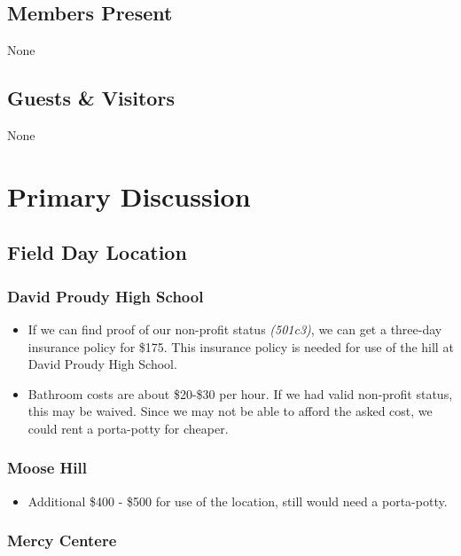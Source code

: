 \documentclass[10pt,letterpaper]{article}
\begin{document}
\subsection{Members Present}

None

\subsection{Guests \& Visitors}

None

\section{Primary Discussion}

\subsection{Field Day Location}

\subsubsection{David Proudy High School}

\begin{itemize}
\item If we can find proof of our non-profit status \emph{(501c3)}, we can get a three-day insurance policy for \$175. This insurance policy is needed for use of the hill at David Proudy High School.
\item Bathroom costs are about \$20-\$30 per hour. If we had valid non-profit status, this may be waived. Since we may not be able to afford the asked cost, we could rent a porta-potty for cheaper.
\end{itemize}

\subsubsection{Moose Hill}

\begin{itemize}
\item Additional \$400 - \$500 for use of the location, still would need a porta-potty.
\end{itemize}

\subsubsection{Mercy Centere}
\end{document}
